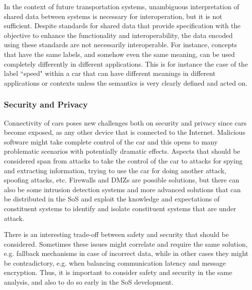 In the context of future transportation systems, unambiguous interpretation of shared data between systems is necessary for interoperation, but it is not sufficient. Despite standards for shared data that provide specification with the objective to enhance the functionality and interoperability, the data encoded using these standards are not necessarily interoperable. For instance, concepts that have the same labels, and somehow even the same meaning, can be used completely differently in different applications. This is for instance the case of the label ``speed" within a car that can have different meanings in different applications or contexts unless the semantics is very clearly defined and acted on.
%


\subsubsection{Security and Privacy}

Connectivity of cars poses new challenges both on security and privacy since cars become exposed, as any other device that is connected to the Internet. Malicious software might take complete control of the car and this opens to many problematic scenarios with potentially dramatic effects.
Aspects that should be considered span from attacks to take the control of the car to attacks for spying and extracting information, trying to use the car for doing another attack, spoofing attacks, etc. Firewalls and DMZs are possible solutions, but there can also be some intrusion detection systems and more advanced solutions that can be distributed in the SoS and exploit the knowledge and expectations of constituent systems to identify and isolate constituent systems that are under attack.

There is an interesting trade-off between safety and security that should be considered. Sometimes these issues might correlate and require the same solution, e.g. fallback mechanisms in case of incorrect data, while in other cases they might be contradictory, e.g. when balancing communication latency and message encryption. Thus, it is important to consider safety and security in the same analysis, and also to do so early in the SoS development.

